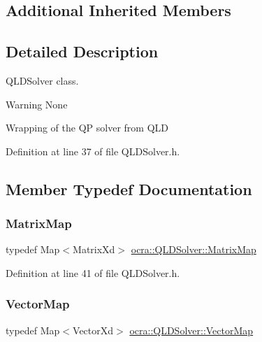 \subsection*{Additional Inherited Members}


\subsection{Detailed Description}
Q\+L\+D\+Solver class. 

\begin{DoxyWarning}{Warning}
None
\end{DoxyWarning}
Wrapping of the QP solver from Q\+LD 

Definition at line 37 of file Q\+L\+D\+Solver.\+h.



\subsection{Member Typedef Documentation}
\hypertarget{classocra_1_1QLDSolver_aebfc53b837336b9942a8ed2e6ca6c0e2}{}\label{classocra_1_1QLDSolver_aebfc53b837336b9942a8ed2e6ca6c0e2} 
\subsubsection{\texorpdfstring{Matrix\+Map}{MatrixMap}}
{\footnotesize\ttfamily typedef Map$<$Matrix\+Xd$>$ \hyperlink{classocra_1_1QLDSolver_aebfc53b837336b9942a8ed2e6ca6c0e2}{ocra\+::\+Q\+L\+D\+Solver\+::\+Matrix\+Map}}



Definition at line 41 of file Q\+L\+D\+Solver.\+h.

\hypertarget{classocra_1_1QLDSolver_a0f7e278b557ca2b7fad6d059ee87a707}{}\label{classocra_1_1QLDSolver_a0f7e278b557ca2b7fad6d059ee87a707} 
\subsubsection{\texorpdfstring{Vector\+Map}{VectorMap}}
{\footnotesize\ttfamily typedef Map$<$Vector\+Xd$>$ \hyperlink{classocra_1_1QLDSolver_a0f7e278b557ca2b7fad6d059ee87a707}{ocra\+::\+Q\+L\+D\+Solver\+::\+Vector\+Map}}




